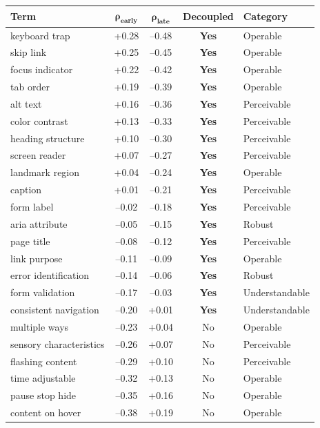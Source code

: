 \documentclass[10pt]{article} %
\begin{document}
\begin{table}[H]
\centering
\scriptsize
\begin{tabular}{|l|c|c|c|l|}
\hline
\textbf{Term} & $\mathbf{\rho_\text{early}}$ & $\mathbf{\rho_\text{late}}$ & \textbf{Decoupled} & \textbf{Category} \\
\hline
keyboard trap & +0.28 & --0.48 & \textbf{Yes} & Operable \\
skip link & +0.25 & --0.45 & \textbf{Yes} & Operable \\
focus indicator & +0.22 & --0.42 & \textbf{Yes} & Operable \\
tab order & +0.19 & --0.39 & \textbf{Yes} & Operable \\
alt text & +0.16 & --0.36 & \textbf{Yes} & Perceivable \\
color contrast & +0.13 & --0.33 & \textbf{Yes} & Perceivable \\
heading structure & +0.10 & --0.30 & \textbf{Yes} & Perceivable \\
screen reader & +0.07 & --0.27 & \textbf{Yes} & Perceivable \\
landmark region & +0.04 & --0.24 & \textbf{Yes} & Operable \\
caption & +0.01 & --0.21 & \textbf{Yes} & Perceivable \\
form label & --0.02 & --0.18 & \textbf{Yes} & Perceivable \\
aria attribute & --0.05 & --0.15 & \textbf{Yes} & Robust \\
page title & --0.08 & --0.12 & \textbf{Yes} & Perceivable \\
link purpose & --0.11 & --0.09 & \textbf{Yes} & Operable \\
error identification & --0.14 & --0.06 & \textbf{Yes} & Robust \\
form validation & --0.17 & --0.03 & \textbf{Yes} & Understandable \\
consistent navigation & --0.20 & +0.01 & \textbf{Yes} & Understandable \\
multiple ways & --0.23 & +0.04 & No & Operable \\
sensory characteristics & --0.26 & +0.07 & No & Perceivable \\
flashing content & --0.29 & +0.10 & No & Perceivable \\
time adjustable & --0.32 & +0.13 & No & Operable \\
pause stop hide & --0.35 & +0.16 & No & Operable \\
content on hover & --0.38 & +0.19 & No & Operable \\

\end{tabular}
\end{table}
\end{document}
